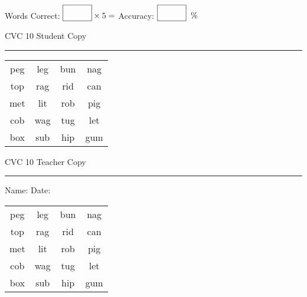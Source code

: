 \documentclass{memoir}
\begin{document}
\small

Words Correct: $\fbox{\phantom{\huge 100}} \times 5 = $ Accuracy: $\fbox{\phantom{\huge 100}}\;\; \%$ 

\vfill

\newpage


\footnotesize \noindent
CVC 10 \hfill Student Copy
\smallskip
\hrule

\Large

\setlength{\tabcolsep}{14pt}
\def\arraystretch{2}

{\selectfont


\begin{vplace}[0.5]
\begin{center}
\begin{tabular}{cccc}
peg & leg & bun & nag \\
top & rag & rid & can \\
met & lit & rob & pig \\
cob & wag & tug & let \\
box & sub & hip & gum  \\
\end{tabular}
\end{center}
\end{vplace}

}

\newpage

\footnotesize \noindent
CVC 10 \hfill Teacher Copy
\smallskip
\hrule

\small

\vfill

\noindent
Name: \underline{\hspace{1.75in}} \hfill Date: \underline{\hspace{1in}}

\Large

{\selectfont


\begin{vplace}[0.5]
\begin{center}
\begin{tabular}{cccc}
peg & leg & bun & nag \\
top & rag & rid & can \\
met & lit & rob & pig \\
cob & wag & tug & let \\
box & sub & hip & gum  \\
\end{tabular}
\end{center}
\end{vplace}



}
\end{document}
